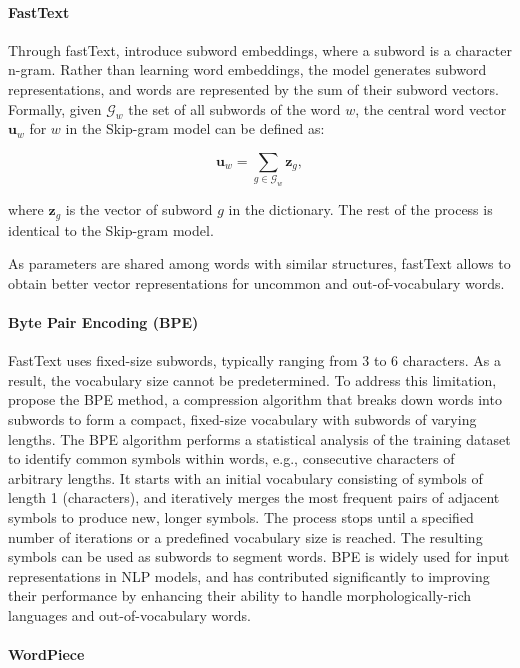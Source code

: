 \paragraph{FastText} Through fastText, \citet{bojanowski2017enriching} introduce subword embeddings, where a subword is a character n-gram. Rather than learning word embeddings, the model generates subword representations, and words are represented by the sum of their subword vectors. Formally, given $\mathcal{G}_w$ the set of all subwords of the word $w$, the central word vector $\bm{u}_w$ for $w$ in the Skip-gram model can be defined as:

\begin{equation}
    \bm{u}_w = \sum_{g \in \mathcal{G}_w} \bm{z}_g,
\end{equation}

where $\bm{z}_g$ is the vector of subword $g$ in the dictionary. The rest of the process is identical to the Skip-gram model.

As parameters are shared among words with similar structures, fastText allows to obtain better vector representations for uncommon and out-of-vocabulary words.

\paragraph{Byte Pair Encoding (BPE)}

FastText uses fixed-size subwords, typically ranging from 3 to 6 characters. As a result, the vocabulary size cannot be predetermined. To address this limitation, \citet{gage1994new} propose the \ac{BPE} method, a compression algorithm that breaks down words into subwords to form a compact, fixed-size vocabulary with subwords of varying lengths. The \ac{BPE} algorithm performs a statistical analysis of the training dataset to identify common symbols within words, e.g., consecutive characters of arbitrary lengths. It starts with an initial vocabulary consisting of symbols of length 1 (characters), and iteratively merges the most frequent pairs of adjacent symbols to produce new, longer symbols. The process stops until a specified number of iterations or a predefined vocabulary size is reached. The resulting symbols can be used as subwords to segment words. \ac{BPE} is widely used for input representations in \ac{NLP} models, and has contributed significantly to improving their performance by enhancing their ability to handle morphologically-rich languages and out-of-vocabulary words.

\paragraph{WordPiece}

